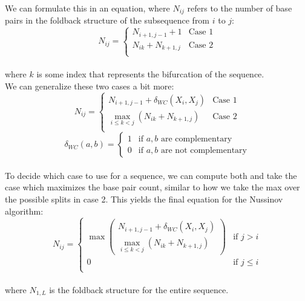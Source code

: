 \documentclass[12pt]{article}
\begin{document}
We can formulate this in an equation, where $N_{ij}$ refers to the number of base pairs in the foldback structure of the subsequence from $i$ to $j$:\\[10pt]
\begin{equation*}
N_{ij} = \begin{cases}
N_{i+1, j-1} + 1 &\text{Case 1}\\
N_{ik} + N_{k+1,j} &\text{Case 2}\\
\end{cases}
\end{equation*}\\[10pt]
where $k$ is some index that represents the bifurcation of the sequence.\\
We can generalize these two cases a bit more:\\[10pt]
\begin{equation*}
N_{ij} = \begin{cases}
N_{i+1, j-1} + \delta_{WC}\left( X_i, X_j\right) &\text{Case 1}\\
\max\limits_{i\leq k <j}\left( N_{ik} + N_{k+1,j}\right) &\text{Case 2}\\
\end{cases}
\end{equation*}
$$\delta_{WC}\left(a, b\right) = \begin{cases}
1 & \text{if } a,b \text{ are complementary}\\
0 & \text{if } a,b \text{ are not complementary}
\end{cases}$$\\[10pt]
To decide which case to use for a sequence, we can compute both and take the case which maximizes the base pair count, similar to how we take the max over the possible splits in case 2. This yields the final equation for the Nussinov algorithm:\\[10pt]
\begin{equation*}
N_{ij} = 
\begin{cases}
\max 
\begin{pmatrix}
N_{i+1, j-1} + \delta_{WC} \left(X_i, X_j\right) \\
\max\limits_{i\leq k <j} \left(N_{ik} + N_{k+1,j}\right) 
\end{pmatrix}&\text{if } j > i\\
0&\text{if } j\leq i\\
\end{cases}
\end{equation*}\\[10pt]
where $N_{1, L}$ is the foldback structure for the entire sequence.\\[10pt]
\end{document}
